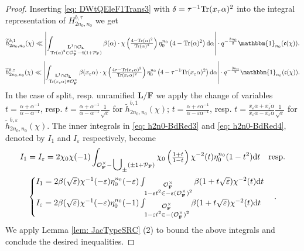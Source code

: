 \documentclass[A4]{amsart}
\numberwithin{equation}{section} \everymath{\displaystyle}
\newcommand{\Tr}{{\rm Tr}}
\newcommand{\id}{\mathbbm{1}}
\newcommand{\ud}{\mathrm{d}}
\newcommand{\F}{\mathbf{F}}
\newcommand{\bL}{\mathbf{L}}
\newcommand{\vO}{\mathcal{O}}
\newcommand{\vP}{\mathcal{P}}
\newcommand{\extnorm}[1]{\left\lvert #1 \right\rvert}
\newcommand{\cond}{\mathfrak{c}}
\begin{document}
\begin{proof}
\noindent Inserting \eqref{eq: DWtQEleF1Trans3} with $\delta = \tau^{-1} \Tr(x_{\tau} \alpha)^2$ into the integral representation of $H_{2n_0,n_0}^{b,\tau}$ we get
\begin{equation} \label{eq: h2n0-BdRed3}
	\widetilde{h}_{2n_0,n_0}^{b,1}(\chi) \ll \extnorm{ \int_{\substack{\bL^1 \cap \vO_{\bL} \\ \Tr(\alpha)^2 \in \vO_{\F}^{\times} - 4(1+\vP_{\F})}} \beta(\alpha) \cdot \chi \left( \tfrac{4-\Tr(\alpha)^2}{\Tr(\alpha)^2} \right) \eta_0^{n_0} \left( 4 - \Tr(\alpha)^2 \right) \ud \alpha } \cdot q^{-\frac{3n_0}{2}} \id_{n_0}(\cond(\chi)).
\end{equation}
\begin{equation} \label{eq: h2n0-BdRed4}
	\widetilde{h}_{2n_0,n_0}^{b,\varepsilon}(\chi) \ll \extnorm{ \int_{\substack{\bL^1 \cap \vO_{\bL} \\ \Tr(x_{\varepsilon} \alpha) \in \vO_{\F}^{\times}}} \beta(x_{\varepsilon} \alpha) \cdot \chi \left( \tfrac{4 \tau -\Tr(x_{\varepsilon} \alpha)^2}{\Tr(x_{\varepsilon} \alpha)^2} \right) \eta_0^{n_0} \left( 4 - \tau^{-1} \Tr(x_{\varepsilon} \alpha)^2 \right) \ud \alpha } \cdot q^{-\frac{3n_0}{2}} \id_{n_0}(\cond(\chi)).
\end{equation}
	In the case of split, resp. unramified $\bL/\F$ we apply the change of variables $t = \tfrac{\alpha + \alpha^{-1}}{\alpha - \alpha^{-1}}$, resp. $t = \tfrac{\alpha + \alpha^{-1}}{\alpha - \alpha^{-1}} \tfrac{1}{\sqrt{\varepsilon}}$ for $\widetilde{h}_{2n_0,n_0}^{b,1}(\chi)$; $t = \tfrac{\alpha + \varepsilon \alpha^{-1}}{\alpha - \varepsilon \alpha^{-1}}$, resp. $t = \tfrac{x_{\varepsilon}\alpha + \overline{x_{\varepsilon}\alpha}}{x_{\varepsilon}\alpha - \overline{x_{\varepsilon}\alpha}} \tfrac{1}{\sqrt{\varepsilon}}$ for $\widetilde{h}_{2n_0,n_0}^{b,\varepsilon}(\chi)$. The inner integrals in \eqref{eq: h2n0-BdRed3} and \eqref{eq: h2n0-BdRed4}, denoted by $I_1$ and $I_{\varepsilon}$ respectively, become
\begin{multline*} 
	I_1 = I_{\varepsilon} = 2 \chi_0\chi(-1) \int_{\vO_{\F}^{\times} - \sideset{}{_{\pm}} \bigcup (\pm 1+\vP_{\F})} \chi_0 \left( \tfrac{1+t}{1-t} \right) \chi^{-2}(t) \eta_0^{n_0}(1-t^2) \ud t \quad {\rm resp.} \\
	\begin{cases} 
		I_1 = 2\beta(\sqrt{\varepsilon})\chi^{-1}(-\varepsilon) \eta_0^{n_0}(-\varepsilon) \int_{\substack{\vO_{\F}^{\times} \\ 1-\varepsilon t^2 \in -\varepsilon (\vO_{\F}^{\times})^2}} \beta(1+t \sqrt{\varepsilon}) \chi^{-2}(t) \ud t \\
		I_{\varepsilon} = 2\beta(\sqrt{\varepsilon})\chi^{-1}(-\varepsilon) \eta_0^{n_0}(-1) \int_{\substack{\vO_{\F}^{\times} \\ 1-\varepsilon t^2 \in - (\vO_{\F}^{\times})^2}} \beta(1+t \sqrt{\varepsilon}) \chi^{-2}(t) \ud t
	\end{cases}.
\end{multline*}
	We apply Lemma \ref{lem: JacTypeSRC} (2) to bound the above integrals and conclude the desired inequalities.
\end{proof}
\end{document}
